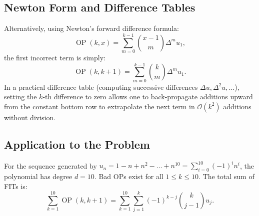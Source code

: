 \documentclass[11pt, letterpaper]{article}
\theoremstyle{plain}
\theoremstyle{definition}
\theoremstyle{remark}
\begin{document}
\subsection*{Newton Form and Difference Tables}
Alternatively, using Newton's forward difference formula:
\[
    \operatorname{OP}(k, x) = \sum_{m=0}^{k-1} \binom{x-1}{m} \Delta^m u_1,
\]
the first incorrect term is simply:
\[
    \operatorname{OP}(k, k+1) = \sum_{m=0}^{k-1} \binom{k}{m} \Delta^m u_1.
\]
In a practical difference table (computing successive differences $\Delta u, \Delta^2 u, \dots$), setting the $k$-th difference to zero allows one to back-propagate additions upward from the constant bottom row to extrapolate the next term in $\mathcal{O}(k^2)$ additions without division.

\subsection*{Application to the Problem}
For the sequence generated by $u_n = 1 - n + n^2 - \dots + n^{10} = \sum_{i=0}^{10} (-1)^i n^i$, the polynomial has degree $d = 10$. Bad OPs exist for all $1 \le k \le 10$. The total sum of FITs is:
\[
    \sum_{k=1}^{10} \operatorname{OP}(k, k+1) = \sum_{k=1}^{10} \sum_{j=1}^k (-1)^{k-j} \binom{k}{j-1} u_j.
\]
\end{document}
